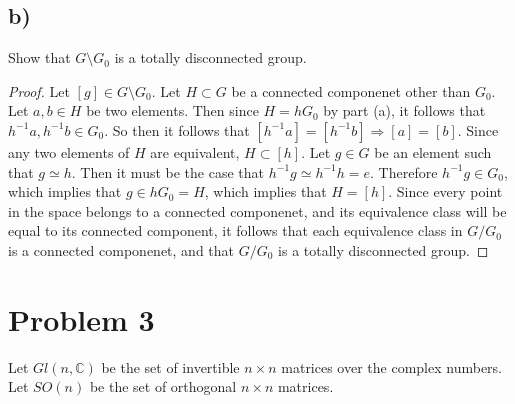 \documentclass{article}
\theoremstyle{definition}
\begin{document}
\subsection*{b)}
\begin{mdframed}[]
    Show that $G \setminus G_0$ is a totally disconnected group.
\end{mdframed}
\begin{proof}
    Let $[g] \in G \setminus G_0$. Let $H \subset G$ be a connected componenet other than $G_0$.
    Let $a,b \in H$ be two elements. Then since $H = hG_0$ by part (a), it follows that $h^{-1}a, h^{-1}b \in G_0$.
    So then it follows that $[h^{-1}a] = [h^{-1}b] \Rightarrow [a] = [b]$. Since any two elements of $H$ are equivalent,
    $H \subset [h]$. Let $g \in G$ be an element such that $g \simeq h$. Then it must be the case that 
    $h^{-1}g \simeq h^{-1}h= e$. Therefore $h^{-1}g \in G_0$, which implies that $g \in hG_0 = H$, which implies that $H = [h]$.
    Since every point in the space belongs to a connected componenet, and its equivalence class will be equal to its connected component,
    it follows that each equivalence class in $G / G_0$ is a connected componenet, and that 
    $G / G_0$ is a totally disconnected group.
\end{proof}
\section*{Problem 3}
Let $Gl(n,\mathbb{C})$ be the set of invertible $n \times n$ matrices over the complex numbers.
Let $SO(n)$ be the set of orthogonal $n \times n$ matrices.
\end{document}
